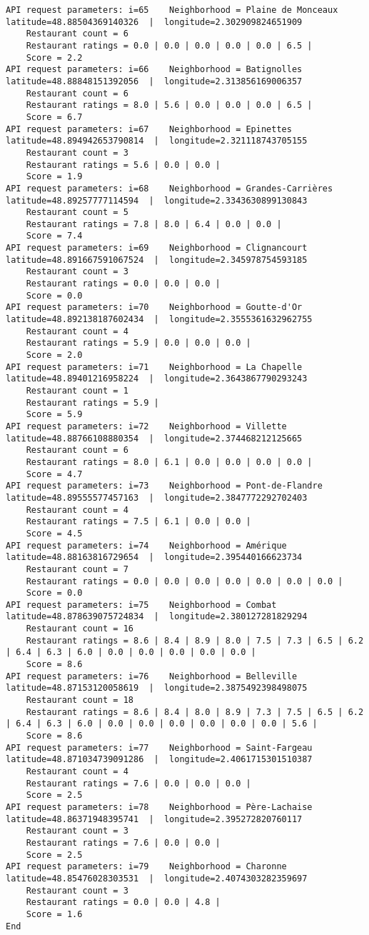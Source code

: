 \documentclass[11pt]{article}
\begin{document}
    \begin{Verbatim}[commandchars=\\\{\}]
API request parameters: i=65 	Neighborhood = Plaine de Monceaux 	latitude=48.88504369140326  |  longitude=2.302909824651909
	Restaurant count = 6
	Restaurant ratings = 0.0 | 0.0 | 0.0 | 0.0 | 0.0 | 6.5 | 
	Score = 2.2
API request parameters: i=66 	Neighborhood = Batignolles 	latitude=48.88848151392056  |  longitude=2.313856169006357
	Restaurant count = 6
	Restaurant ratings = 8.0 | 5.6 | 0.0 | 0.0 | 0.0 | 6.5 | 
	Score = 6.7
API request parameters: i=67 	Neighborhood = Epinettes 	latitude=48.894942653790814  |  longitude=2.321118743705155
	Restaurant count = 3
	Restaurant ratings = 5.6 | 0.0 | 0.0 | 
	Score = 1.9
API request parameters: i=68 	Neighborhood = Grandes-Carrières 	latitude=48.89257777114594  |  longitude=2.3343630899130843
	Restaurant count = 5
	Restaurant ratings = 7.8 | 8.0 | 6.4 | 0.0 | 0.0 | 
	Score = 7.4
API request parameters: i=69 	Neighborhood = Clignancourt 	latitude=48.891667591067524  |  longitude=2.345978754593185
	Restaurant count = 3
	Restaurant ratings = 0.0 | 0.0 | 0.0 | 
	Score = 0.0
API request parameters: i=70 	Neighborhood = Goutte-d'Or 	latitude=48.892138187602434  |  longitude=2.3555361632962755
	Restaurant count = 4
	Restaurant ratings = 5.9 | 0.0 | 0.0 | 0.0 | 
	Score = 2.0
API request parameters: i=71 	Neighborhood = La Chapelle 	latitude=48.89401216958224  |  longitude=2.3643867790293243
	Restaurant count = 1
	Restaurant ratings = 5.9 | 
	Score = 5.9
API request parameters: i=72 	Neighborhood = Villette 	latitude=48.88766108880354  |  longitude=2.374468212125665
	Restaurant count = 6
	Restaurant ratings = 8.0 | 6.1 | 0.0 | 0.0 | 0.0 | 0.0 | 
	Score = 4.7
API request parameters: i=73 	Neighborhood = Pont-de-Flandre 	latitude=48.89555577457163  |  longitude=2.3847772292702403
	Restaurant count = 4
	Restaurant ratings = 7.5 | 6.1 | 0.0 | 0.0 | 
	Score = 4.5
API request parameters: i=74 	Neighborhood = Amérique 	latitude=48.88163816729654  |  longitude=2.395440166623734
	Restaurant count = 7
	Restaurant ratings = 0.0 | 0.0 | 0.0 | 0.0 | 0.0 | 0.0 | 0.0 | 
	Score = 0.0
API request parameters: i=75 	Neighborhood = Combat 	latitude=48.878639075724834  |  longitude=2.380127281829294
	Restaurant count = 16
	Restaurant ratings = 8.6 | 8.4 | 8.9 | 8.0 | 7.5 | 7.3 | 6.5 | 6.2 | 6.4 | 6.3 | 6.0 | 0.0 | 0.0 | 0.0 | 0.0 | 0.0 | 
	Score = 8.6
API request parameters: i=76 	Neighborhood = Belleville 	latitude=48.87153120058619  |  longitude=2.3875492398498075
	Restaurant count = 18
	Restaurant ratings = 8.6 | 8.4 | 8.0 | 8.9 | 7.3 | 7.5 | 6.5 | 6.2 | 6.4 | 6.3 | 6.0 | 0.0 | 0.0 | 0.0 | 0.0 | 0.0 | 0.0 | 5.6 | 
	Score = 8.6
API request parameters: i=77 	Neighborhood = Saint-Fargeau 	latitude=48.871034739091286  |  longitude=2.4061715301510387
	Restaurant count = 4
	Restaurant ratings = 7.6 | 0.0 | 0.0 | 0.0 | 
	Score = 2.5
API request parameters: i=78 	Neighborhood = Père-Lachaise 	latitude=48.86371948395741  |  longitude=2.395272820760117
	Restaurant count = 3
	Restaurant ratings = 7.6 | 0.0 | 0.0 | 
	Score = 2.5
API request parameters: i=79 	Neighborhood = Charonne 	latitude=48.85476028303531  |  longitude=2.4074303282359697
	Restaurant count = 3
	Restaurant ratings = 0.0 | 0.0 | 4.8 | 
	Score = 1.6
End


\end{Verbatim}
\end{document}

